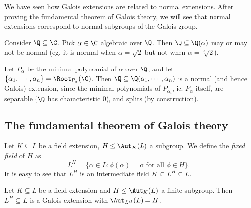 \documentclass[a4paper]{article}
\begin{document}
We have seen how Galois extensions are related to normal extensions. After proving the fundamental theorem of Galois theory, we will see that normal extensions correspond to normal subgroups of the Galois group.

\begin{eg}
  Consider $\Q \subseteq \C$. Pick $\alpha \in \C$ algebraic over $\Q$. Then $\Q \subseteq \Q(\alpha)$ may or may not be normal (eg. it is normal when $\alpha = \sqrt{2}$ but not when $\alpha = \sqrt[3]{2}$).

  Let $P_\alpha$ be the minimal polynomial of $\alpha$ over $\Q$, and let $\{\alpha_1, \cdots, \alpha_n\} = \Root_{P_\alpha}(\C)$. Then $\Q\subseteq \Q(\alpha_1, \cdots, \alpha_n)$ is a normal (and hence Galois) extension, since the minimal polynomials of $P_{\alpha_i}$, ie. $P_\alpha$ itself, are separable ($\Q$ has characteristic 0), and splits (by construction).
\end{eg}
\subsection{The fundamental theorem of Galois theory}
\begin{defi}
  Let $K\subseteq L$ be a field extension, $H\leq \Aut_K(L)$ a subgroup. We define the \emph{fixed field} of $H$ as
  \[
    L^H = \{\alpha \in L: \phi(\alpha) = \alpha\text{ for all }\phi \in H\}.
  \]
  It is easy to see that $L^H$ is an intermediate field $K\subseteq L^H \subseteq L$.
\end{defi}

\begin{lemma}
  Let $K\subseteq L$ be a field extension and $H\leq \Aut_K(L)$ a finite subgroup. Then $L^H\subseteq L$ is a Galois extension with $\Aut_{L^H}(L) = H$.
\end{lemma}
\end{document}

